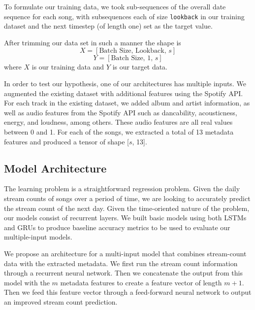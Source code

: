 \documentclass[11pt]{article}
\begin{document}

To formulate our training data, we took sub-sequences of the overall date sequence for each song, with subsequences each of size \texttt{lookback} in our training dataset and the next timestep (of length one) set as the target value.

 After trimming our data set in such a manner the shape is 
\[X = [\text{Batch Size, Lookback, $s$}]\]
\[Y = [\text{Batch Size, 1, $s$}]\]
where $X$ is our training data and $Y$ is our target data.

In order to test our hypothesis, one of our architectures has multiple inputs. We augmented the existing dataset with additional features using the Spotify API. For each track in the existing dataset, we added album and artist information, as well as audio features from the Spotify API such as dancability, acousticness, energy, and loudness, among others. These audio features are all real values between 0 and 1. For each of the songs, we extracted a total of 13 metadata features and produced a tensor of shape [$s$, 13].

\subsection{Model Architecture}

The learning problem is a straightforward regression problem. Given the daily stream counts of songs over a period of time, we are looking to accurately predict the stream count of the next day. Given the time-oriented nature of the problem, our models consist of recurrent layers. We built basic models using both LSTMs and GRUs to produce baseline accuracy metrics to be used to evaluate our multiple-input models. 

We propose an architecture for a multi-input model that combines stream-count data with the extracted metadata. We first run the stream count information through a recurrent neural network. Then we concatenate the output from this model with the $m$ metadata features to create a feature vector of length $m + 1$. Then we feed this feature vector through a feed-forward neural network to output an improved stream count prediction.
\end{document}
